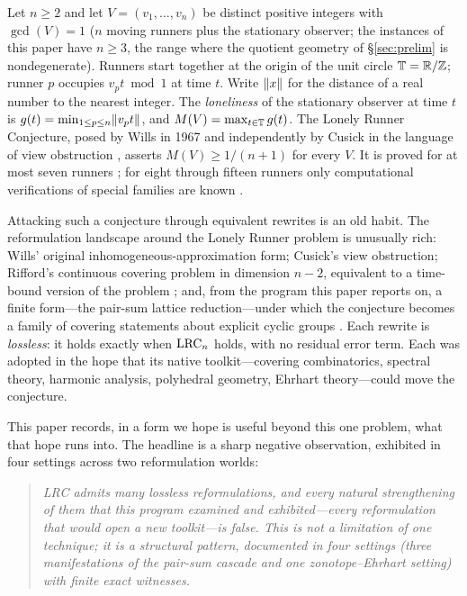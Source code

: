Let $n\ge 2$ and let $V=(v_1,\dots,v_n)$ be distinct positive integers
with $\gcd(V)=1$ ($n$ moving runners plus the stationary observer; the
instances of this paper have $n\ge 3$, the range where the quotient
geometry of \S\ref{sec:prelim} is nondegenerate). Runners start together
at the origin of the unit circle
$\mathbb{T}=\mathbb{R}/\mathbb{Z}$; runner $p$ occupies $v_p t \bmod 1$ at time $t$. Write
$\lVert x \rVert$ for the distance of a real number to the nearest integer. The
\emph{loneliness} of the stationary observer at time $t$ is
$g(t)=\min_{1\le p\le n}\lVert v_p t \rVert$, and $M(V)=\max_{t\in\mathbb{T}}g(t)$. The
Lonely Runner Conjecture, posed by Wills in 1967 and independently by
Cusick in the language of view obstruction
\cite{PS-survey,Wills,Cusick1973}, asserts $M(V)\ge 1/(n{+}1)$ for every
$V$. It is proved for at most seven runners \cite{PS-survey}; for eight
through fifteen runners only computational verifications of special
families are known
\cite{Rosenfeld8,Trakulthongchai,Sungkawichai,Allikvere,MSS}.

Attacking such a conjecture through equivalent rewrites is an old habit.
The reformulation landscape around the Lonely Runner problem is unusually
rich: Wills' original inhomogeneous-approximation form; Cusick's view
obstruction; Rifford's continuous covering problem in dimension $n-2$,
equivalent to a time-bound version of the problem \cite{Rifford}; and, from
the program this paper reports on, a finite form---the pair-sum lattice
reduction---under which the conjecture becomes a family of covering
statements about explicit cyclic groups \cite{PS-survey,prog-artifacts}.
Each rewrite is \emph{lossless}: it holds exactly when $\mathrm{LRC}_n$ holds,
with no residual error term. Each was adopted in the hope that its native
toolkit---covering combinatorics, spectral theory, harmonic analysis,
polyhedral geometry, Ehrhart theory---could move the conjecture.

This paper records, in a form we hope is useful beyond this one problem,
what that hope runs into. The headline is a sharp negative observation,
exhibited in four settings across two reformulation worlds:

\begin{quote}
\emph{LRC admits many lossless reformulations, and every natural
strengthening of them that this program examined and exhibited---every
reformulation that would open a new toolkit---is false. This is not a
limitation of one technique; it is a structural pattern, documented in
four settings (three manifestations of the pair-sum cascade and one
zonotope--Ehrhart setting) with finite exact witnesses.}
\end{quote}

